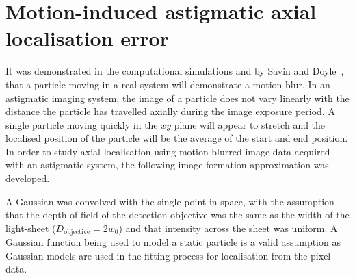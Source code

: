 \section{Motion-induced astigmatic axial localisation error}\label{sec:spt_maths}

It was demonstrated in the computational simulations and by Savin and Doyle~\cite{savinStaticDynamicErrors2005}, that a particle moving in a real system will demonstrate a motion blur.
In an astigmatic imaging system, the image of a particle does not vary linearly with the distance the particle has travelled axially during the image exposure period.
A single particle moving quickly in the \(xy\) plane will appear to stretch and the localised position of the particle will be the average of the start and end position.
In order to study axial localisation using motion-blurred image data acquired with an astigmatic system, the following image formation approximation was developed.

A Gaussian was convolved with the single point in space, with the assumption that the depth of field of the detection objective was the same as the width of the light-sheet (\(D_{\text{objective}}=2w_0\)) and that intensity across the sheet was uniform.
A Gaussian function being used to model a static particle is a valid assumption as Gaussian models are used in the fitting process for localisation from the pixel data.

